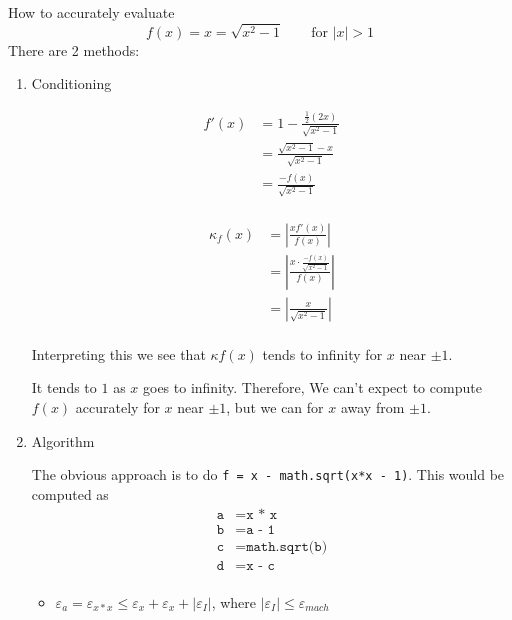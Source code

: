 \begin{example}
    How to accurately evaluate \[
        f(x) = x = \sqrt{x^2 - 1} \qquad \text{for } |x| > 1
    \]
    There are 2 methods:

    \begin{enumerate}
        \item Conditioning

              \begin{minipage}[t]{0.45\linewidth}
                  \begin{align*}
                      f'(x)
                       & = 1 - \frac{\frac{1}{2} (2x)}{\sqrt{x^2 - 1}} \\
                       & = \frac{\sqrt{x^2 - 1} - x}{\sqrt{x^2 - 1}}   \\
                       & = \frac{-f(x)}{\sqrt{x^2 - 1}}                \\
                  \end{align*}
              \end{minipage}
              \begin{minipage}[t]{0.45\linewidth}
                  \begin{align*}
                      \kappa_f(x)
                       & = \left| \frac{x f'(x)}{f(x)} \right|                              \\
                       & = \left| \frac{x \cdot \frac{-f(x)}{\sqrt{x^2 - 1}}}{f(x)} \right| \\
                       & = \left| \frac{x}{\sqrt{x^2 - 1}} \right|                          \\
                  \end{align*}
              \end{minipage}

              Interpreting this we see that \( \kappa{f(x)} \) tends to infinity for \( x \) near \( \pm 1 \).

              It tends to \( 1 \) as \( x \) goes to infinity. Therefore, We can't expect to compute \( f(x) \) accurately for \( x \) near \( \pm 1 \), but we can for \( x \) away from \( \pm 1 \).
        \item Algorithm

              The obvious approach is to do \texttt{f = x - math.sqrt(x*x - 1)}. This would be computed as
              \begin{align*}
                  \texttt{a} & = \texttt{x * x}        \\
                  \texttt{b} & = \texttt{a - 1}        \\
                  \texttt{c} & = \texttt{math.sqrt(b)} \\
                  \texttt{d} & = \texttt{x - c}        \\
              \end{align*}
              \begin{itemize}
                  \item \( \varepsilon_a = \varepsilon_{x*x} \le \varepsilon_x + \varepsilon_x + |\varepsilon_I|\), where \( |\varepsilon_I| \le \varepsilon_{mach} \)


\end{itemize}
\end{enumerate}
\end{example}
